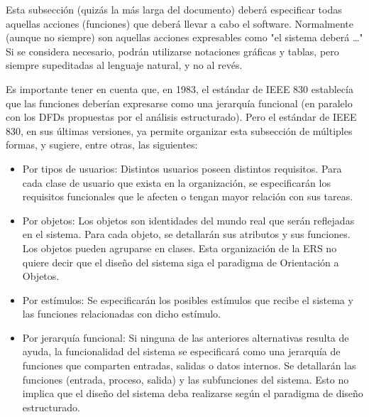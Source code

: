\documentclass[12pt,a4paper, twosite]{article}
\begin{document}
Esta subsección (quizás la más larga del documento) deberá
especificar todas aquellas acciones (funciones) que deberá llevar a
cabo el software. Normalmente (aunque no siempre) son aquellas
acciones expresables como "el sistema deberá \ldots{}" Si se considera
necesario, podrán utilizarse notaciones gráficas y tablas, pero
siempre supeditadas al lenguaje natural, y no al revés.

Es importante tener en cuenta que, en 1983, el estándar de IEEE 830
establecía que las funciones deberían expresarse como una jerarquía
funcional (en paralelo con los DFDs propuestas por el análisis
estructurado). Pero el estándar de IEEE 830, en sus últimas
versiones, ya permite organizar esta subsección de múltiples formas,
y sugiere, entre otras, las siguientes:


\begin{itemize}
\item Por tipos de usuarios: 
    Distintos usuarios poseen distintos requisitos. Para cada clase de
usuario que exista en la organización, se especificarán los
requisitos funcionales que le afecten o tengan mayor relación con
sus tareas.
\end{itemize}


\begin{itemize}
\item Por objetos:
   Los objetos son identidades del mundo real que serán reflejadas en
el sistema. Para cada objeto, se detallarán sus atributos y sus
funciones. Los objetos pueden agruparse en clases. Esta organización
de la ERS no quiere decir que el diseño del sistema siga el
paradigma de Orientación a Objetos.
\end{itemize}


\begin{itemize}
\item Por estímulos: 
  Se especificarán los posibles estímulos que recibe el sistema y las
funciones relacionadas con dicho estímulo.
\end{itemize}


\begin{itemize}
\item Por jerarquía funcional: 
   Si ninguna de las anteriores alternativas resulta de ayuda, la
funcionalidad del sistema se especificará como una jerarquía de
funciones que comparten entradas, salidas o datos internos. Se
detallarán las funciones (entrada, proceso, salida) y las
subfunciones del sistema. Esto no implica que el diseño del sistema
deba realizarse según el paradigma de diseño estructurado.
\end{itemize}
\end{document}
